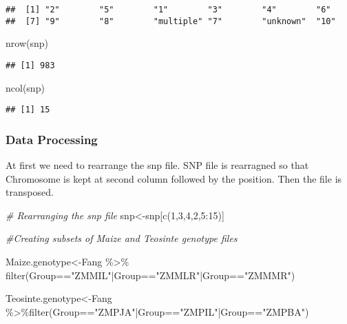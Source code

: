 \documentclass[
]{article}
\newenvironment{Shaded}{\begin{snugshade}}{\end{snugshade}}
\newcommand{\CommentTok}[1]{\textcolor[rgb]{0.56,0.35,0.01}{\textit{#1}}}
\newcommand{\DecValTok}[1]{\textcolor[rgb]{0.00,0.00,0.81}{#1}}
\newcommand{\FunctionTok}[1]{\textcolor[rgb]{0.00,0.00,0.00}{#1}}
\newcommand{\NormalTok}[1]{#1}
\newcommand{\OtherTok}[1]{\textcolor[rgb]{0.56,0.35,0.01}{#1}}
\newcommand{\SpecialCharTok}[1]{\textcolor[rgb]{0.00,0.00,0.00}{#1}}
\newcommand{\StringTok}[1]{\textcolor[rgb]{0.31,0.60,0.02}{#1}}
\begin{document}
\begin{verbatim}
##  [1] "2"        "5"        "1"        "3"        "4"        "6"       
##  [7] "9"        "8"        "multiple" "7"        "unknown"  "10"
\end{verbatim}

\begin{Shaded}
\begin{Highlighting}[]
\FunctionTok{nrow}\NormalTok{(snp)}
\end{Highlighting}
\end{Shaded}

\begin{verbatim}
## [1] 983
\end{verbatim}

\begin{Shaded}
\begin{Highlighting}[]
\FunctionTok{ncol}\NormalTok{(snp)}
\end{Highlighting}
\end{Shaded}

\begin{verbatim}
## [1] 15
\end{verbatim}

\hypertarget{data-processing}{%
\subsubsection{Data Processing}\label{data-processing}}

At first we need to rearrange the snp file. SNP file is rearragned so
that Chromosome is kept at second column followed by the position. Then
the file is transposed.

\begin{Shaded}
\begin{Highlighting}[]
\CommentTok{\# Rearranging the snp file}
\NormalTok{snp}\OtherTok{\textless{}{-}}\NormalTok{snp[}\FunctionTok{c}\NormalTok{(}\DecValTok{1}\NormalTok{,}\DecValTok{3}\NormalTok{,}\DecValTok{4}\NormalTok{,}\DecValTok{2}\NormalTok{,}\DecValTok{5}\SpecialCharTok{:}\DecValTok{15}\NormalTok{)]}

\CommentTok{\#Creating subsets of Maize and Teosinte genotype files}

\NormalTok{Maize.genotype}\OtherTok{\textless{}{-}}\NormalTok{Fang }\SpecialCharTok{\%\textgreater{}\%} \FunctionTok{filter}\NormalTok{(Group}\SpecialCharTok{==}\StringTok{"ZMMIL"}\SpecialCharTok{|}\NormalTok{Group}\SpecialCharTok{==}\StringTok{"ZMMLR"}\SpecialCharTok{|}\NormalTok{Group}\SpecialCharTok{==}\StringTok{"ZMMMR"}\NormalTok{) }

\NormalTok{Teosinte.genotype}\OtherTok{\textless{}{-}}\NormalTok{Fang }\SpecialCharTok{\%\textgreater{}\%}\FunctionTok{filter}\NormalTok{(Group}\SpecialCharTok{==}\StringTok{"ZMPJA"}\SpecialCharTok{|}\NormalTok{Group}\SpecialCharTok{==}\StringTok{"ZMPIL"}\SpecialCharTok{|}\NormalTok{Group}\SpecialCharTok{==}\StringTok{"ZMPBA"}\NormalTok{)}
\end{Highlighting}
\end{Shaded}
\end{document}
